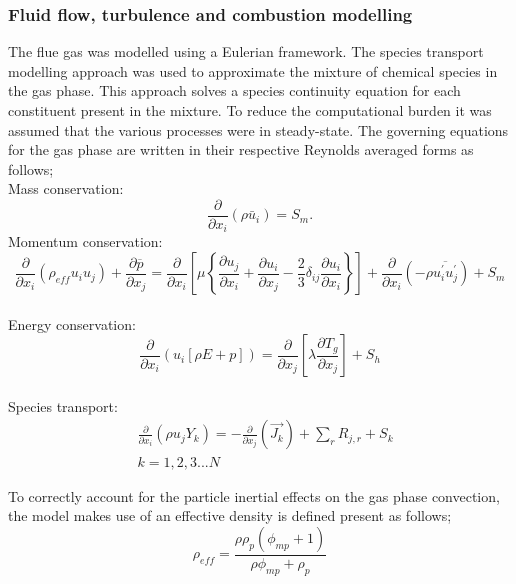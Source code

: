\documentclass[review]{elsarticle}
\begin{document}
\subsubsection{Fluid flow, turbulence and combustion modelling}
The flue gas was modelled using a Eulerian framework. The species transport modelling approach was used to approximate the mixture of chemical species in the gas phase. This approach solves a species continuity equation for each constituent present in the mixture. To reduce the computational burden it was assumed that the various processes were in steady-state. The governing equations for the gas phase are written in their respective Reynolds averaged forms as follows;\\
Mass conservation:
\begin{equation}\label{eqn_RANS_mass}
\frac{\partial}{\partial x_{i}}(\rho \bar{u}_{i})=S_{m}.
\end{equation}
Momentum conservation:
\\
\begin{equation}\label{eqn_momentum}
\frac{\partial}{\partial x_{i}}(\rho_{eff} u_{i}u_{j})+\frac{\partial \overline{p}}{\partial x_{j}}=\frac{\partial}{\partial x_{i}}\left[\mu\left\{\frac{\partial u_{j}}{\partial x_{i}}+\frac{\partial u_{i}}{\partial x_{j}}-\frac{2}{3}\delta_{ij}\frac{\partial u_{i}}{\partial x_{i}}\right\}\right]+\frac{\partial}{\partial x_{i}}(-\rho\overline{u_{i}^{'}u_{j}^{'}})+S_m
\end{equation}\\
Energy conservation:
\begin{equation}\label{eqn_energy}
\frac{\partial }{\partial x_{i}} (u_{i}[\rho E+p])=\frac{\partial }{\partial x_{j}}\left[\lambda\frac{\partial T_{g}}{\partial x_{j}}\right] +S_{h}
\end{equation}
\\
Species transport:
\begin{equation}\label{eqn_species}
\begin{split}
&\frac{\partial}{\partial x_{i}}(\rho u_{j}Y_{k})=-\frac{\partial}{\partial x_{j}}(\vec{J_{k}})+ \sum_r R_{j,r} + S_{k}\\
&k = 1,2,3...N
\end{split}
\end{equation}

To correctly account for the particle inertial effects on the gas phase convection, the model makes use of an effective density is defined present as follows;
\begin{equation} \label{eqn_eff_rho}
	\rho_{eff} = \frac{\rho \rho_p \left( \phi_{mp} + 1 \right)}{\rho \phi_{mp} + \rho_p}
\end{equation}
\end{document}
